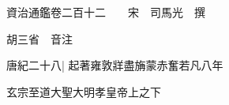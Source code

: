 






























































資治通鑑卷二百十二　　宋　司馬光　撰

胡三省　音注

唐紀二十八|{
	起著雍敦牂盡㫋蒙赤奮若凡八年}


玄宗至道大聖大明孝皇帝上之下

